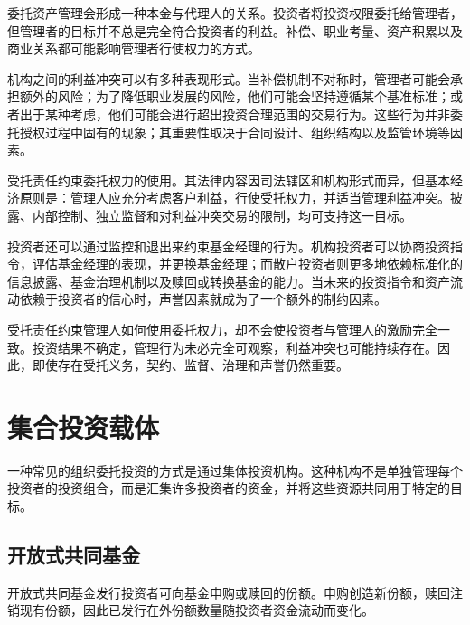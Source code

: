委托资产管理会形成一种本金与代理人的关系。投资者将投资权限委托给管理者，但管理者的目标并不总是完全符合投资者的利益。补偿、职业考量、资产积累以及商业关系都可能影响管理者行使权力的方式。

机构之间的利益冲突可以有多种表现形式。当补偿机制不对称时，管理者可能会承担额外的风险；为了降低职业发展的风险，他们可能会坚持遵循某个基准标准；或者出于某种考虑，他们可能会进行超出投资合理范围的交易行为。这些行为并非委托授权过程中固有的现象；其重要性取决于合同设计、组织结构以及监管环境等因素。

受托责任约束委托权力的使用。其法律内容因司法辖区和机构形式而异，但基本经济原则是：管理人应充分考虑客户利益，行使受托权力，并适当管理利益冲突。披露、内部控制、独立监督和对利益冲突交易的限制，均可支持这一目标。

投资者还可以通过监控和退出来约束基金经理的行为。机构投资者可以协商投资指令，评估基金经理的表现，并更换基金经理；而散户投资者则更多地依赖标准化的信息披露、基金治理机制以及赎回或转换基金的能力。当未来的投资指令和资产流动依赖于投资者的信心时，声誉因素就成为了一个额外的制约因素。

\begin{tcolorbox}[
  enhanced,
  breakable,
  colback=white,
  colframe=FinanceBlue,
  boxrule=0.7pt,
  sharp corners,
  borderline west={2.2pt}{0pt}{FinanceBlue},
  title=\textbf{财务展望：诚信责任并不能消除代理问题},
  coltitle=white,
  colbacktitle=FinanceBlue,
  fonttitle=\bfseries,
  before skip=1.2em,
  after skip=1.2em
]

受托责任约束管理人如何使用委托权力，却不会使投资者与管理人的激励完全一致。投资结果不确定，管理行为未必完全可观察，利益冲突也可能持续存在。因此，即使存在受托义务，契约、监督、治理和声誉仍然重要。

\end{tcolorbox}

\section{集合投资载体}

一种常见的组织委托投资的方式是通过集体投资机构。这种机构不是单独管理每个投资者的投资组合，而是汇集许多投资者的资金，并将这些资源共同用于特定的目标。

\subsection{开放式共同基金}

开放式共同基金发行投资者可向基金申购或赎回的份额。申购创造新份额，赎回注销现有份额，因此已发行在外份额数量随投资者资金流动而变化。

